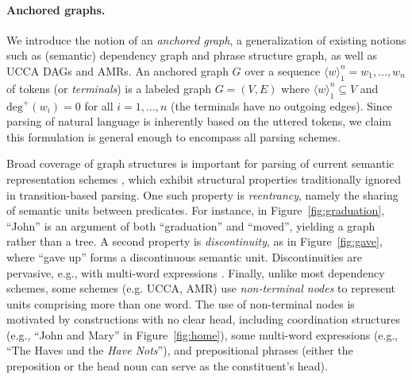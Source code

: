 \documentclass[11pt,a4paper]{article}
\newcommand{\figref}[1]{Figure~\ref{#1}}
\begin{document}
\paragraph{Anchored graphs.}
We introduce the notion of an \textit{anchored graph},
a generalization of existing notions such as (semantic) dependency graph and phrase structure graph,
as well as UCCA DAGs and AMRs.
An anchored graph $G$ over a sequence $\langle w\rangle_1^n=w_1, \ldots, w_n$ of tokens
(or \textit{terminals}) is a labeled graph $G=(V,E)$ where $\langle w\rangle_1^n \subseteq V$ and
$\mathrm{deg}^+(w_i) = 0$ for all $i=1,\ldots,n$ (the terminals have no outgoing edges).
Since parsing of natural language is inherently based on the uttered tokens,
we claim this formulation is general enough to encompass all parsing schemes.

Broad coverage of graph structures is important for parsing of current semantic representation schemes
\cite{abend2017state}, which exhibit structural properties traditionally ignored in transition-based
parsing.
One such property is \textit{reentrancy},
namely the sharing of semantic units between predicates.
For instance, in \figref{fig:graduation},
``John'' is an argument of both ``graduation''
and ``moved'', yielding a graph rather than a tree.
A second property is \textit{discontinuity},
as in \figref{fig:gave}, where ``gave up'' forms a discontinuous semantic unit.
Discontinuities are pervasive, e.g.,  with multi-word
expressions \cite{schneider2014discriminative}.
Finally, unlike most dependency schemes, some schemes (e.g. UCCA, AMR) use \textit{non-terminal nodes}
to represent units comprising more than one word.
The use of non-terminal nodes is motivated by constructions with no clear head, including
coordination structures (e.g., ``John and Mary'' in \figref{fig:home}),
some multi-word expressions (e.g., ``The Haves and the \textit{Have Nots}''),
and prepositional phrases (either the preposition or the head noun can serve as the constituent's head).
\end{document}
